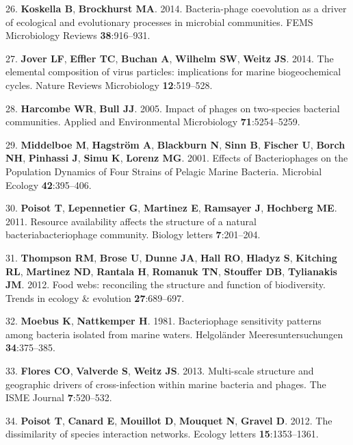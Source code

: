 \documentclass[12pt,]{article}
\begin{document}
\hypertarget{ref-Koskella:2014ds}{}
26. \textbf{Koskella B}, \textbf{Brockhurst MA}. 2014. Bacteria-phage
coevolution as a driver of ecological and evolutionary processes in
microbial communities. FEMS Microbiology Reviews \textbf{38}:916--931.

\hypertarget{ref-Jover:2014gq}{}
27. \textbf{Jover LF}, \textbf{Effler TC}, \textbf{Buchan A},
\textbf{Wilhelm SW}, \textbf{Weitz JS}. 2014. The elemental composition
of virus particles: implications for marine biogeochemical cycles.
Nature Reviews Microbiology \textbf{12}:519--528.

\hypertarget{ref-Harcombe:2005fd}{}
28. \textbf{Harcombe WR}, \textbf{Bull JJ}. 2005. Impact of phages on
two-species bacterial communities. Applied and Environmental
Microbiology \textbf{71}:5254--5259.

\hypertarget{ref-Middelboe:2001fl}{}
29. \textbf{Middelboe M}, \textbf{Hagström A}, \textbf{Blackburn N},
\textbf{Sinn B}, \textbf{Fischer U}, \textbf{Borch NH}, \textbf{Pinhassi
J}, \textbf{Simu K}, \textbf{Lorenz MG}. 2001. Effects of Bacteriophages
on the Population Dynamics of Four Strains of Pelagic Marine Bacteria.
Microbial Ecology \textbf{42}:395--406.

\hypertarget{ref-Poisot:2011jc}{}
30. \textbf{Poisot T}, \textbf{Lepennetier G}, \textbf{Martinez E},
\textbf{Ramsayer J}, \textbf{Hochberg ME}. 2011. Resource availability
affects the structure of a natural bacteriabacteriophage community.
Biology letters \textbf{7}:201--204.

\hypertarget{ref-Thompson:2012ki}{}
31. \textbf{Thompson RM}, \textbf{Brose U}, \textbf{Dunne JA},
\textbf{Hall RO}, \textbf{Hladyz S}, \textbf{Kitching RL},
\textbf{Martinez ND}, \textbf{Rantala H}, \textbf{Romanuk TN},
\textbf{Stouffer DB}, \textbf{Tylianakis JM}. 2012. Food webs:
reconciling the structure and function of biodiversity. Trends in
ecology \& evolution \textbf{27}:689--697.

\hypertarget{ref-Moebus:1981kp}{}
32. \textbf{Moebus K}, \textbf{Nattkemper H}. 1981. Bacteriophage
sensitivity patterns among bacteria isolated from marine waters.
Helgoländer Meeresuntersuchungen \textbf{34}:375--385.

\hypertarget{ref-Flores:2013hc}{}
33. \textbf{Flores CO}, \textbf{Valverde S}, \textbf{Weitz JS}. 2013.
Multi-scale structure and geographic drivers of cross-infection within
marine bacteria and phages. The ISME Journal \textbf{7}:520--532.

\hypertarget{ref-Poisot:2012fh}{}
34. \textbf{Poisot T}, \textbf{Canard E}, \textbf{Mouillot D},
\textbf{Mouquet N}, \textbf{Gravel D}. 2012. The dissimilarity of
species interaction networks. Ecology letters \textbf{15}:1353--1361.
\end{document}
